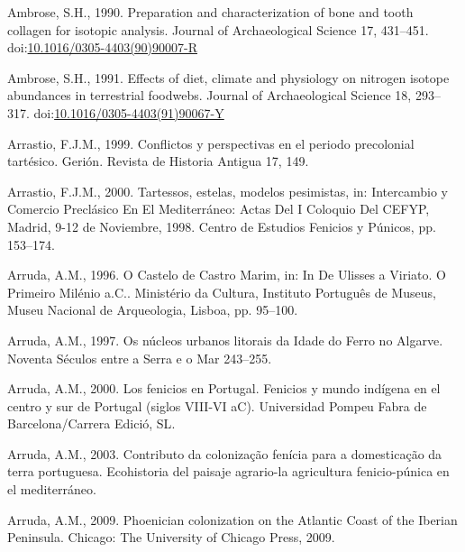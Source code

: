 \documentclass[review]{elsarticle} %
\newlength{\cslhangindent}
\newenvironment{CSLReferences}[2] %
 {%
  \setlength{\parindent}{0pt}
  \ifodd #1 \everypar{\setlength{\hangindent}{\cslhangindent}}\ignorespaces\fi
  \ifnum #2 > 0
  \setlength{\parskip}{#2\baselineskip}
  \fi
 }%
 {}
\begin{document}
\hypertarget{refs}{}
\begin{CSLReferences}{1}{0}
\leavevmode{}%
Ambrose, S.H., 1990. Preparation and characterization of bone and tooth collagen for isotopic analysis. Journal of Archaeological Science 17, 431--451. doi:\href{https://doi.org/10.1016/0305-4403(90)90007-R}{10.1016/0305-4403(90)90007-R}

\leavevmode{}%
Ambrose, S.H., 1991. Effects of diet, climate and physiology on nitrogen isotope abundances in terrestrial foodwebs. Journal of Archaeological Science 18, 293--317. doi:\href{https://doi.org/10.1016/0305-4403(91)90067-Y}{10.1016/0305-4403(91)90067-Y}

\leavevmode{}%
Arrastio, F.J.M., 1999. Conflictos y perspectivas en el periodo precolonial tartésico. Gerión. Revista de Historia Antigua 17, 149.

\leavevmode{}%
Arrastio, F.J.M., 2000. Tartessos, estelas, modelos pesimistas, in: Intercambio y Comercio Preclásico En El {Mediterráneo}: Actas Del {I} Coloquio Del {CEFYP}, {Madrid}, 9-12 de Noviembre, 1998. {Centro de Estudios Fenicios y Púnicos}, pp. 153--174.

\leavevmode{}%
Arruda, A.M., 1996. O {Castelo} de {Castro Marim}, in: In {De Ulisses} a {Viriato}. {O} Primeiro Milénio a.{C}.. {Ministério da Cultura, Instituto Português de Museus, Museu Nacional de Arqueologia}, {Lisboa}, pp. 95--100.

\leavevmode{}%
Arruda, A.M., 1997. Os núcleos urbanos litorais da {Idade} do {Ferro} no {Algarve}. Noventa Séculos entre a Serra e o Mar 243--255.

\leavevmode{}%
Arruda, A.M., 2000. Los fenicios en {Portugal}. {Fenicios} y mundo indígena en el centro y sur de {Portugal} (siglos {VIII}-{VI aC}). {Universidad Pompeu Fabra de Barcelona/Carrera Edició, SL}.

\leavevmode{}%
Arruda, A.M., 2003. Contributo da colonização fenícia para a domesticação da terra portuguesa. Ecohistoria del paisaje agrario-la agricultura fenicio-púnica en el mediterráneo.

\leavevmode{}%
Arruda, A.M., 2009. Phoenician colonization on the {Atlantic Coast} of the {Iberian Peninsula}. {Chicago: The University of Chicago Press, 2009.}


\end{CSLReferences}
\end{document}
